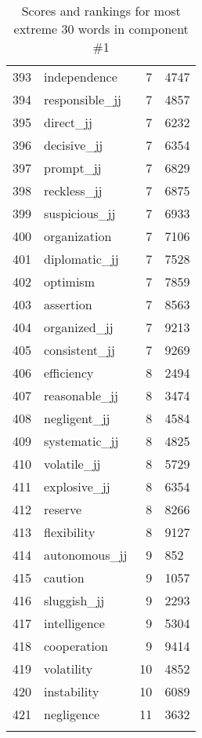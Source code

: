 \begin{longtable}[!htbp]{| rlr@{.}l |}
    393 & independence & 7 & 4747 \\
    394 & responsible\_jj & 7 & 4857 \\
    395 & direct\_jj & 7 & 6232 \\
    396 & decisive\_jj & 7 & 6354 \\
    397 & prompt\_jj & 7 & 6829 \\
    398 & reckless\_jj & 7 & 6875 \\
    399 & suspicious\_jj & 7 & 6933 \\
    400 & organization & 7 & 7106 \\
    401 & diplomatic\_jj & 7 & 7528 \\
    402 & optimism & 7 & 7859 \\
    403 & assertion & 7 & 8563 \\
    404 & organized\_jj & 7 & 9213 \\
    405 & consistent\_jj & 7 & 9269 \\
    406 & efficiency & 8 & 2494 \\
    407 & reasonable\_jj & 8 & 3474 \\
    408 & negligent\_jj & 8 & 4584 \\
    409 & systematic\_jj & 8 & 4825 \\
    410 & volatile\_jj & 8 & 5729 \\
    411 & explosive\_jj & 8 & 6354 \\
    412 & reserve & 8 & 8266 \\
    413 & flexibility & 8 & 9127 \\
    414 & autonomous\_jj & 9 & 852 \\
    415 & caution & 9 & 1057 \\
    416 & sluggish\_jj & 9 & 2293 \\
    417 & intelligence & 9 & 5304 \\
    418 & cooperation & 9 & 9414 \\
    419 & volatility & 10 & 4852 \\
    420 & instability & 10 & 6089 \\
    421 & negligence & 11 & 3632 \\
    \hline
    \caption{Scores and rankings for most extreme 30 words in component \#1} \\
\end{longtable}
